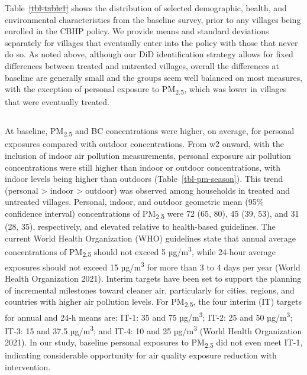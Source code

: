\documentclass[
  letterpaper,
  DIV=11,
  numbers=noendperiod]{scrartcl}
\providecommand{\DIFadd}[1]{{\protect\color{blue}\uwave{#1}}} %
\providecommand{\DIFdel}[1]{{\protect\color{red}\sout{#1}}}                      %
\providecommand{\DIFaddbegin}{} %
\providecommand{\DIFaddend}{} %
\providecommand{\DIFdelbegin}{} %
\providecommand{\DIFdelend}{} %
\newcommand{\DIFscaledelfig}{0.5}
\newlength{\DIFdelgraphicswidth} %
\newlength{\DIFdelgraphicsheight} %
\newcommand{\DIFaddincludegraphics}[2][]{{\color{blue}\fbox{\DIFOincludegraphics[#1]{#2}}}} %
\newcommand{\DIFdelincludegraphics}[2][]{%
\sbox{\DIFdelgraphicsbox}{\DIFOincludegraphics[#1]{#2}}%
\settoboxwidth{\DIFdelgraphicswidth}{\DIFdelgraphicsbox} %
\settoboxtotalheight{\DIFdelgraphicsheight}{\DIFdelgraphicsbox} %
\scalebox{\DIFscaledelfig}{%
\parbox[b]{\DIFdelgraphicswidth}{\usebox{\DIFdelgraphicsbox}\\[-\baselineskip] \rule{\DIFdelgraphicswidth}{0em}}\llap{\resizebox{\DIFdelgraphicswidth}{\DIFdelgraphicsheight}{%
\setlength{\unitlength}{\DIFdelgraphicswidth}%
\begin{picture}(1,1)%
\thicklines\linethickness{2pt} %
{\color[rgb]{1,0,0}\put(0,0){\framebox(1,1){}}}%
{\color[rgb]{1,0,0}\put(0,0){\line( 1,1){1}}}%
{\color[rgb]{1,0,0}\put(0,1){\line(1,-1){1}}}%
\end{picture}%
}\hspace*{3pt}}} %
} %
\DeclareRobustCommand{\DIFaddbegin}{\DIFOaddbegin \let\includegraphics\DIFaddincludegraphics} %
\DeclareRobustCommand{\DIFaddend}{\DIFOaddend \let\includegraphics\DIFOincludegraphics} %
\DeclareRobustCommand{\DIFdelbegin}{\DIFOdelbegin \let\includegraphics\DIFdelincludegraphics} %
\DeclareRobustCommand{\DIFdelend}{\DIFOaddend \let\includegraphics\DIFOincludegraphics} %
\begin{document}
Table~\DIFdelbegin \DIFdel{\ref{tbl-table1} }\DIFdelend \DIFaddbegin \DIFadd{\ref{tbl-desc} }\DIFaddend shows the distribution of selected demographic,
health, and environmental characteristics from the baseline survey,
prior to any villages being enrolled in the CBHP policy. We provide
means and standard deviations separately for villages that eventually
enter into the policy with those that never do so. As noted above,
although our DiD identification strategy allows for fixed differences
between treated and untreated villages, overall the differences at
baseline are generally small and the groups seem well balanced on most
measures, with the exception of personal exposure to
PM\textsubscript{2.5}, which was lower in villages that were eventually
treated.

\DIFdelbegin %
\DIFdelend \DIFaddbegin \subsection{\DIFadd{Summary of PM and BC
measurements}}\label{summary-of-pm-and-bc-measurements}
\DIFaddend 

At baseline, PM\textsubscript{2.5} and BC concentrations were higher, on
average, for personal exposures compared with outdoor concentrations.
From w2 onward, with the inclusion of indoor air pollution measurements,
personal exposure air pollution concentrations were still higher than
indoor or outdoor concentrations, with indoor levels being higher than
outdoors (Table~\ref{tbl-pm-season}). This trend (personal
\textgreater{} indoor \textgreater{} outdoor) was observed among
households in treated and untreated villages. Personal, indoor, and
outdoor geometric mean (95\% confidence interval) concentrations of
PM\textsubscript{2.5} were 72 (65, 80), 45 (39, 53), and 31 (28, 35),
respectively, and elevated relative to health-based guidelines. The
current World Health Organization (WHO) guidelines state that annual
average concentrations of PM\textsubscript{2.5} should not exceed 5
µg/m\textsuperscript{3}, while 24-hour average exposures should not
exceed 15 µg/m\textsuperscript{3} for more than 3 to 4 days per year
(World Health Organization 2021). Interim targets have been set to
support the planning of incremental milestones toward cleaner air,
particularly for cities, regions, and countries with higher air
pollution levels. For PM\textsubscript{2.5}, the four interim (IT)
targets for annual and 24-h means are: IT-1: 35 and 75
µg/m\textsuperscript{3}; IT-2: 25 and 50 µg/m\textsuperscript{3}; IT-3:
15 and 37.5 µg/m\textsuperscript{3}; and IT-4: 10 and 25
µg/m\textsuperscript{3} (World Health Organization 2021). In our study,
baseline personal exposures to PM\textsubscript{2.5} did not even meet
IT-1, indicating considerable opportunity for air quality exposure
reduction with intervention.
\end{document}
